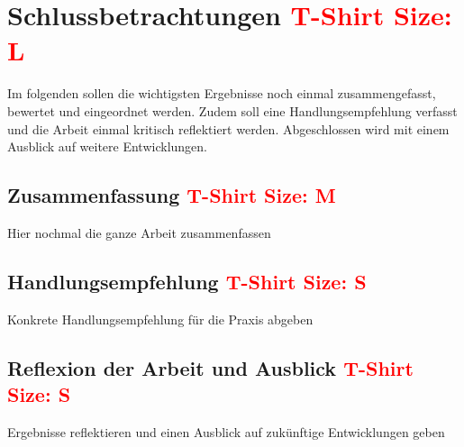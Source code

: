 \chapter{Schlussbetrachtungen \textcolor{red}{T-Shirt Size: L}}

Im folgenden sollen die wichtigsten Ergebnisse noch einmal zusammengefasst, bewertet und eingeordnet werden. Zudem soll eine Handlungsempfehlung verfasst und die Arbeit einmal kritisch reflektiert werden. Abgeschlossen wird mit einem Ausblick auf weitere Entwicklungen.

\section{Zusammenfassung \textcolor{red}{T-Shirt Size: M}}

Hier nochmal die ganze Arbeit zusammenfassen

\section{Handlungsempfehlung \textcolor{red}{T-Shirt Size: S}}

Konkrete Handlungsempfehlung für die Praxis abgeben

\section{Reflexion der Arbeit und Ausblick \textcolor{red}{T-Shirt Size: S}}

Ergebnisse reflektieren und einen Ausblick auf zukünftige Entwicklungen geben